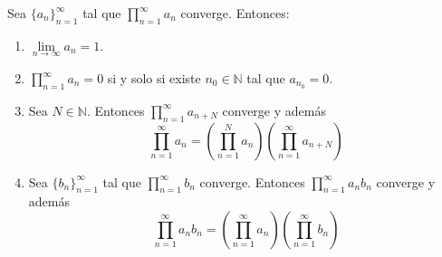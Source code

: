 \begin{theorem}
    Sea $\{a_n\}_{n=1}^\infty$ tal que $\prod_{n=1}^\infty a_n$ converge.
    Entonces:
    \begin{enumerate}
        \item $\lim\limits_{n \to \infty} a_n = 1$.
        \item $\prod_{n=1}^\infty a_n = 0$ si y solo si existe $n_0 \in \mathbb{N}$ tal que $a_{n_0} = 0$.
        \item Sea $N \in \mathbb{N}$.
              Entonces $\prod_{n=1}^\infty a_{n+N}$ converge y además
              $$\prod_{n=1}^\infty a_n = \left(\prod_{n=1}^N a_n\right) \left(\prod_{n=1}^\infty a_{n+N}\right)$$
        \item Sea $\{b_n\}_{n=1}^\infty$ tal que $\prod_{n=1}^\infty b_n$ converge.
              Entonces $\prod_{n=1}^\infty a_nb_n$ converge y además
              $$\prod_{n=1}^\infty a_nb_n = \left(\prod_{n=1}^\infty a_n\right) \left(\prod_{n=1}^\infty b_n\right)$$
    \end{enumerate}
\end{theorem}

